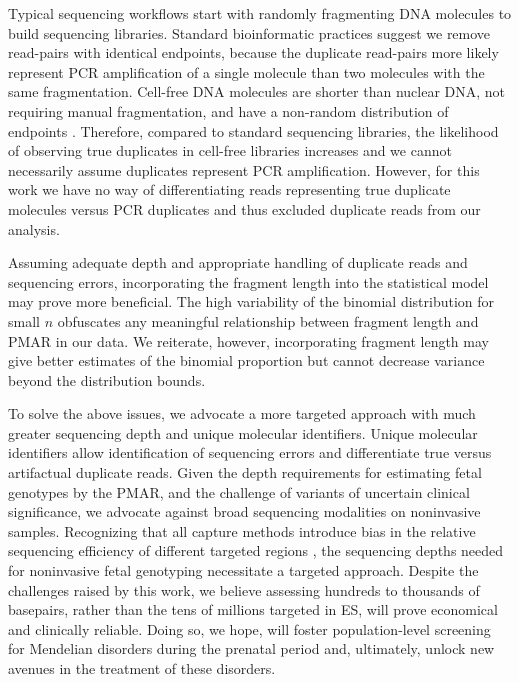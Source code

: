 \documentclass{article}\usepackage[]{graphicx}\usepackage[]{color}
\begin{document}
Typical sequencing workflows start with randomly fragmenting DNA molecules to build sequencing libraries.
Standard bioinformatic practices suggest we remove read-pairs with identical endpoints, because the duplicate read-pairs more likely represent PCR amplification of a single molecule than two molecules with the same fragmentation.
Cell-free DNA molecules are shorter than nuclear DNA, not requiring manual fragmentation, and have a non-random distribution of endpoints \cite{chan:2016aa}.
Therefore, compared to standard sequencing libraries, the likelihood of observing true duplicates in cell-free libraries increases and we cannot necessarily assume duplicates represent PCR amplification.
However, for this work we have no way of differentiating reads representing true duplicate molecules versus PCR duplicates and thus excluded duplicate reads from our analysis.

Assuming adequate depth and appropriate handling of duplicate reads and sequencing errors, incorporating the fragment length into the statistical model may prove more beneficial.
The high variability of the binomial distribution for small $n$ obfuscates any meaningful relationship between fragment length and PMAR in our data.
We reiterate, however, incorporating fragment length may give better estimates of the binomial proportion but cannot decrease variance beyond the distribution bounds.

To solve the above issues, we advocate a more targeted approach with much greater sequencing depth and unique molecular identifiers.
Unique molecular identifiers allow identification of sequencing errors and differentiate true versus artifactual duplicate reads.
Given the depth requirements for estimating fetal genotypes by the PMAR, and the challenge of variants of uncertain clinical significance, we advocate against broad sequencing modalities on noninvasive samples.
Recognizing that all capture methods introduce bias in the relative sequencing efficiency of different targeted regions \cite{seaby:2016aa}, the sequencing depths needed for noninvasive fetal genotyping necessitate a targeted approach.
Despite the challenges raised by this work, we believe assessing hundreds to thousands of basepairs, rather than the tens of millions targeted in ES, will prove economical and clinically reliable.
Doing so, we hope, will foster population-level screening for Mendelian disorders during the prenatal period and, ultimately, unlock new avenues in the treatment of these disorders.

\nolinenumbers
\end{document}
